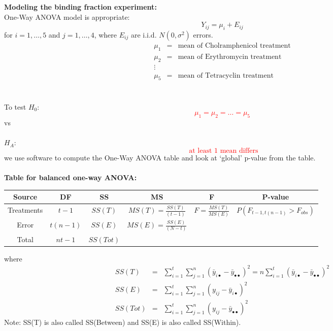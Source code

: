 \textbf{Modeling the binding fraction experiment:}\\
One-Way ANOVA model is appropriate: 
$$Y_{ij} = \mu_i + E_{ij}$$
for $i=1,\ldots,5$ and $j=1,\ldots,4$, where $E_{ij}$ are i.i.d. $N(0,\sigma^2)$ errors.
\begin{eqnarray*}
\mu_1 & = & \mbox{mean of Cholramphenicol treatment}\\
\mu_2 & = & \mbox{mean of Erythromycin treatment}\\
\vdots\\ 
\mu_5 & = & \mbox{mean of Tetracyclin treatment}
\end{eqnarray*}
~\\~\\
To test 
$H_0:$%
\textcolor{red}{$$\mu_1 = \mu_2 = \ldots = \mu_5$$}
vs\\~\\
$H_A:$%
\textcolor{red}{$$\mbox{ at least 1 mean differs}$$}
we use software to compute the One-Way ANOVA table and look at `global' p-value from the table.\\~\\
\textbf{Table for balanced one-way ANOVA:}
\begin{center}
\begin{tabular}{|c|c|c|c|c|c|} \hline
Source & DF & SS & MS & F & P-value\\ \hline
Treatments & $t-1$ & $SS(T)$ & $MS(T)=\frac{SS(T)}{(t-1)}$ & $F=\frac{MS(T)}{MS(E)}$ & $P(F_{t-1,t(n-1)}>F_{obs})$\\ 
Error & $t(n-1)$ & $SS(E)$ & $MS(E)=\frac{SS(E)}{(N-t)}$ & &\\
Total & $nt-1$ & $SS(Tot)$ & & &\\ \hline
\end{tabular}
\end{center}
where
\begin{eqnarray*}
SS(T) & = &\sum_{i=1}^{t} \sum_{j=1}^{n} (\bar{y}_{i\bullet} - \bar{y}_{\bullet\bullet})^2 = n\sum_{i=1}^{t}(\bar{y}_{i\bullet} - \bar{y}_{\bullet\bullet})^2\\
SS(E) & = & \sum_{i=1}^{t} \sum_{j=1}^{n}(y_{ij}-\bar{y}_{i\bullet})^2 \\
SS(Tot)&=& \sum_{i=1}^{t} \sum_{j=1}^{n}(y_{ij}-\bar{y}_{\bullet\bullet})^2
\end{eqnarray*}
Note:  SS(T) is also called SS(Between) and SS(E) is also called SS(Within).

